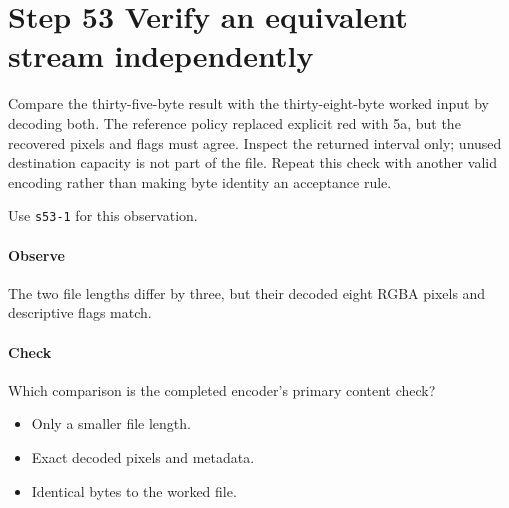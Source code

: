 \section{Step 53 Verify an equivalent stream independently}\label{qoi-s53}
Compare the thirty-five-byte result with the thirty-eight-byte worked input by decoding both. The reference policy replaced explicit red with 5a, but the recovered pixels and flags must agree. Inspect the returned interval only; unused destination capacity is not part of the file. Repeat this check with another valid encoding rather than making byte identity an acceptance rule.

Use \texttt{s53-1} for this observation.

\paragraph{Observe} The two file lengths differ by three, but their decoded eight RGBA pixels and descriptive flags match.

\paragraph{Check} Which comparison is the completed encoder’s primary content check?
\begin{itemize}
\item[A.] Only a smaller file length.
\item[B.] Exact decoded pixels and metadata.
\item[C.] Identical bytes to the worked file.
\end{itemize}
